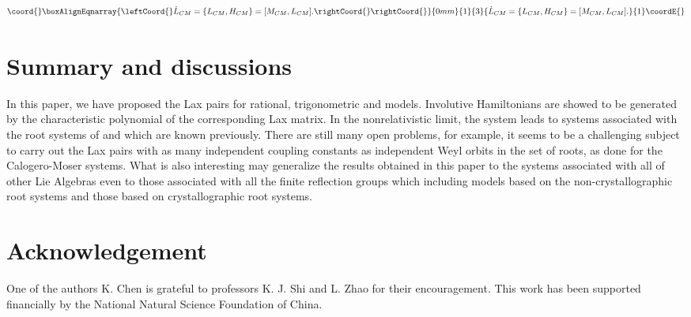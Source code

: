 \documentclass[a4paper,12pt]{article}
\providecommand{\sect}[1]{\setcounter{equation}{0}\section{#1}}
\begin{document}
\begin{eqnarray}\coord{}\boxAlignEqnarray{\leftCoord{}
\dot{L}_{CM}=\{L_{CM},H_{CM}\}=\lbrack M_{CM},L_{CM}\rbrack .\rightCoord{}
\rightCoord{}}{0mm}{1}{3}{
\dot{L}_{CM}=\{L_{CM},H_{CM}\}=\lbrack M_{CM},L_{CM}\rbrack .
}{1}\coordE{}\end{eqnarray}

\sect{Summary and discussions}
\label{sum}
In this paper, we have proposed
the Lax pairs for rational, trigonometric \coordHE{} and \coordHE{}  \coordHE{} models.
Involutive Hamiltonians are showed to be generated by the characteristic
polynomial of the corresponding Lax matrix. In the nonrelativistic limit,
the system leads to \coordHE{} systems associated with the root systems of \coordHE{}
and \coordHE{} which are known previously. There are still many open problems,
for example, it seems to be a challenging subject to carry out the Lax pairs
with as many independent coupling constants as independent Weyl orbits in
the set of roots, as done for the Calogero-Moser systems\cite
{op,bcs,bcs2,bcs3,bcs1,hp1}. What is also interesting may generalize the
results obtained in this paper to the systems associated with all of other
Lie Algebras even to those associated with all the finite reflection groups%
\cite{bcs1} which including models based on the non-crystallographic root
systems and those based on crystallographic root systems.

\section*{Acknowledgement}

One of the authors K. Chen is grateful to professors K. J. Shi and L. Zhao
for their encouragement. This work has been supported financially by the
National Natural Science Foundation of China.

\vspace{1pt}

\vspace{1pt}
\end{document}
